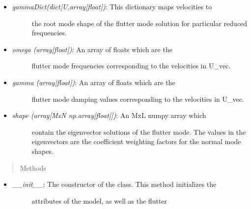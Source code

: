 \documentclass[letterpaper,10pt,english]{sphinxmanual}
\begin{document}
\begin{fulllineitems}
\begin{itemize}
\begin{description}
\end{description}

\item {} \begin{description}
\item[{\emph{gammaDict(dict{[}U,array{[}float{]})}: This dictionary maps velocities to}] \leavevmode
the root mode shape of the flutter mode solution for particular
reduced frequencies.

\end{description}

\item {} \begin{description}
\item[{\emph{omega (array{[}float{]})}: An array of floats which are the}] \leavevmode
flutter mode frequencies corresponding to the velocities in U\_vec.

\end{description}

\item {} \begin{description}
\item[{\emph{gamma (array{[}float{]})}: An array of floats which are the}] \leavevmode
flutter mode damping values corresponding to the velocities in U\_vec.

\end{description}

\item {} \begin{description}
\item[{\emph{shape (array{[}MxN np.array{[}float{]}{]})}: An MxL numpy array which}] \leavevmode
contain the eigenvector solutions of the flutter mode. The values in
the eigenvectors are the coefficient weighting factors for the normal
mode shapes.

\end{description}

\end{itemize}
\begin{quote}\begin{description}
\item[{Methods}] \leavevmode
\end{description}\end{quote}
\begin{itemize}
\item {} \begin{description}
\item[{\emph{\_\_init\_\_}: The constructor of the class. This method initializes the}] \leavevmode
attributes of the model, as well as the flutter


\end{description}
\end{itemize}
\end{fulllineitems}
\end{document}
